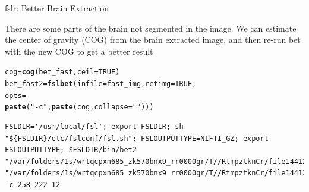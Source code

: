 \documentclass[11pt]{beamer}\usepackage[]{graphicx}\usepackage[]{color}
\makeatletter
\newcommand{\hlnum}[1]{\textcolor[rgb]{0.686,0.059,0.569}{#1}}%
\newcommand{\hlstr}[1]{\textcolor[rgb]{0.192,0.494,0.8}{#1}}%
\newcommand{\hlstd}[1]{\textcolor[rgb]{0.345,0.345,0.345}{#1}}%
\newcommand{\hlkwb}[1]{\textcolor[rgb]{0.69,0.353,0.396}{#1}}%
\newcommand{\hlkwc}[1]{\textcolor[rgb]{0.333,0.667,0.333}{#1}}%
\newcommand{\hlkwd}[1]{\textcolor[rgb]{0.737,0.353,0.396}{\textbf{#1}}}%
\newenvironment{kframe}{%
 \def\at@end@of@kframe{}%
 \ifinner\ifhmode%
  \def\at@end@of@kframe{\end{minipage}}%
  \begin{minipage}{\columnwidth}%
 \fi\fi%
 \def\FrameCommand##1{\hskip\@totalleftmargin \hskip-\fboxsep
 \colorbox{shadecolor}{##1}\hskip-\fboxsep
     \hskip-\linewidth \hskip-\@totalleftmargin \hskip\columnwidth}%
 \MakeFramed {\advance\hsize-\width
   \@totalleftmargin\z@ \linewidth\hsize
   \@setminipage}}%
 {\par\unskip\endMakeFramed%
 \at@end@of@kframe}
\newenvironment{knitrout}{}{} %
\makeatother
\begin{document}
\begin{frame}[fragile]{fslr: Better Brain Extraction}

There are some parts of the brain not segmented in the image.  We can estimate the center of gravity (COG) from the brain extracted image, and then re-run bet with the new COG to get a better result

\begin{knitrout}
\color{fgcolor}\begin{kframe}
\begin{alltt}
\hlstd{cog} \hlkwb{=} \hlkwd{cog}\hlstd{(bet_fast,} \hlkwc{ceil}\hlstd{=}\hlnum{TRUE}\hlstd{)}
\hlstd{bet_fast2} \hlkwb{=} \hlkwd{fslbet}\hlstd{(}\hlkwc{infile}\hlstd{=fast_img,} \hlkwc{retimg}\hlstd{=}\hlnum{TRUE}\hlstd{,}
                   \hlkwc{opts} \hlstd{=}
                     \hlkwd{paste}\hlstd{(}\hlstr{"-c"}\hlstd{,} \hlkwd{paste}\hlstd{(cog,} \hlkwc{collapse}\hlstd{=} \hlstr{" "}\hlstd{)))}
\end{alltt}
\begin{verbatim}
FSLDIR='/usr/local/fsl'; export FSLDIR; sh "${FSLDIR}/etc/fslconf/fsl.sh"; FSLOUTPUTTYPE=NIFTI_GZ; export FSLOUTPUTTYPE; $FSLDIR/bin/bet2 "/var/folders/1s/wrtqcpxn685_zk570bnx9_rr0000gr/T//RtmpztknCr/file1441242fb2d77.nii.gz" "/var/folders/1s/wrtqcpxn685_zk570bnx9_rr0000gr/T//RtmpztknCr/file14412782cc40c" -c 258 222 12 
\end{verbatim}
\end{kframe}
\end{knitrout}
\end{frame}
\end{document}
